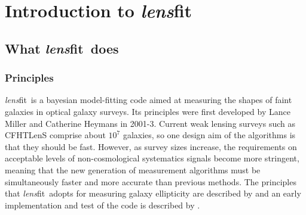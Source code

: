 \documentclass{article}
\def\lensfitsuite{{\em lens}fit\ }
\begin{document}
\section{Introduction to \lensfitsuite}

\subsection{What \lensfitsuite does}

\subsubsection{Principles}
\lensfitsuite is a bayesian model-fitting code aimed at measuring the shapes of 
faint galaxies in optical galaxy surveys.  
Its principles were first developed by Lance Miller and Catherine Heymans in 2001-3.
Current weak lensing surveys such as CFHTLenS comprise about $10^7$ galaxies, so one design
aim of the algorithms is that they should be fast.  However, as survey sizes increase, the 
requirements on 
acceptable levels of non-cosmological systematics signals become more stringent, 
meaning that the new
generation of measurement algorithms must be simultaneously faster and more accurate than
previous methods.
The principles that \lensfitsuite adopts for measuring
galaxy ellipticity are described by \citet{miller07a} and an early implementation and test of the
code is described by \citet{kitching08a}.
\end{document}

